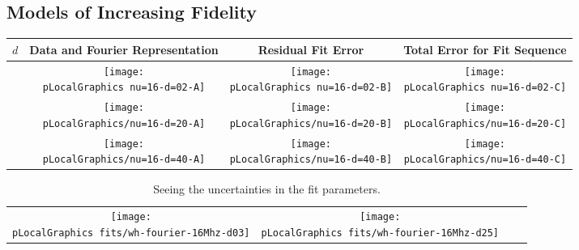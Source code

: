 % 



\subsection{Models of Increasing Fidelity}

%
\begin{table}
    \begin{center}
        \begin{tabular}{cccc}
            $d$ & Data and Fourier Representation & Residual Fit Error & Total Error for Fit Sequence \\\hline
            \raisebox{2.25cm}{$d=2$}
                & \texttt{[image: \\pLocalGraphics nu=16-d=02-A]}
                & \texttt{[image: \\pLocalGraphics nu=16-d=02-B]}
                & \texttt{[image: \\pLocalGraphics nu=16-d=02-C]} \\[5pt]
            \raisebox{2.25cm}{$d=20$}
                & \texttt{[image: \\pLocalGraphics/nu=16-d=20-A]}
                & \texttt{[image: \\pLocalGraphics/nu=16-d=20-B]}
                & \texttt{[image: \\pLocalGraphics/nu=16-d=20-C]} \\[5pt]
            \raisebox{2.25cm}{$d=40$}
                & \texttt{[image: \\pLocalGraphics/nu=16-d=40-A]}
                & \texttt{[image: \\pLocalGraphics/nu=16-d=40-B]}
                & \texttt{[image: \\pLocalGraphics/nu=16-d=40-C]} \\[5pt]
        \end{tabular}
    \end{center}
\label{tab:panels}
\end{table}

\begin{table}
    \begin{center}
	\caption{Seeing the uncertainties in the fit parameters.}
        \begin{tabular}{cccc}
           \texttt{[image: \\pLocalGraphics fits/wh-fourier-16Mhz-d03]} &
           \texttt{[image: \\pLocalGraphics fits/wh-fourier-16Mhz-d25]}
        \end{tabular}
    \end{center}
\label{tab:straws}
\end{table}

\endinput  %
